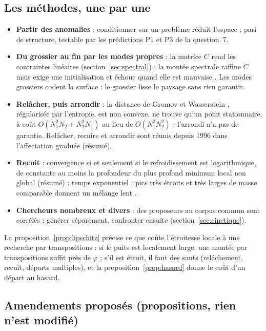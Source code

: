 \documentclass[11pt,a4paper]{article}
\theoremstyle{definition}
\theoremstyle{plain}
\begin{document}
\subsection{Les méthodes, une par une}
\begin{itemize}
\item \textbf{Partir des anomalies} : conditionner sur un problème réduit l'espace ; pari de
structure, testable par les prédictions P1 et P3 de la question~7.
\item \textbf{Du grossier au fin par les modes propres} : la matrice $C$ rend les contraintes
linéaires (section~\ref{sec:spectral}) ; la montée spectrale raffine $C$ mais exige une
initialisation et échoue quand elle est mauvaise \cite[p.~11, figure~25, d'après la question~5]{melzi2019}. Les modes grossiers
codent la surface : le grossier lisse le paysage sans rien garantir.
\item \textbf{Relâcher, puis arrondir} : la distance de Gromov et Wasserstein \cite{memoli2011},
régularisée par l'entropie, est non convexe, ne trouve qu'un point stationnaire, à coût
$O(N_1^2N_2+N_2^2N_1)$ au lieu de $O(N_1^2N_2^2)$ \cite[p.~3-4]{peyre2016} ; l'arrondi n'a pas de
garantie. Relâcher, recuire et arrondir sont réunis depuis 1996 dans l'affectation graduée
\cite{goldrangarajan1996} (résumé).
\item \textbf{Recuit} : convergence si et seulement si le refroidissement est logarithmique, de
constante au moins la profondeur du plus profond minimum local non global \cite{hajek1988} (résumé) :
temps exponentiel ; pics très étroits et très larges de masse comparable donnent un mélange lent
\cite[p.~780]{woodard2009}.
\item \textbf{Chercheurs nombreux et divers} : des proposeurs au corpus commun sont corrélés ; générer
séparément, confronter ensuite (section~\ref{sec:cinetique}).
\end{itemize}

La proposition~\ref{prop:lipschitz} précise ce que coûte l'étroitesse locale à une recherche par
transpositions : si le puits est localement large, une montée par transpositions suffit près de
$\varphi$ ; s'il est étroit, il faut des sauts (relâchement, recuit, départs multiples), et la
proposition~\ref{prop:hasard} donne le coût d'un départ au hasard.

\subsection{Amendements proposés (propositions, rien n'est modifié)}
\end{document}
